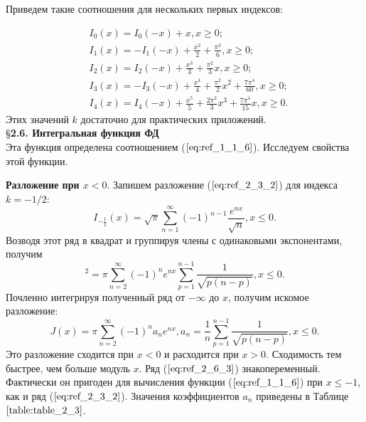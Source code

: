 Приведем такие соотношения для нескольких первых индексов:

\begin{equation}
\begin{aligned}
&I_0(x)=I_0(-x)+x,x \geqslant 0; \\
&I_1(x)=-I_1(-x)+\frac{x^2}{2} + \frac{\pi^2}{6},x \geqslant 0;\\
&I_2(x)=I_2(-x)+\frac{x^3}{3} + \frac{\pi^2}{3}x,x \geqslant 0;\\
&I_3(x)=-I_3(-x)+\frac{x^4}{4} + \frac{\pi^2}{2}x^2 + \frac{7\pi^4}{60},x \geqslant 0;\\
&I_4(x)=I_4(-x)+\frac{x^5}{5} + \frac{2\pi^2}{3}x^3 + \frac{7\pi^4}{15}x,x \geqslant 0.
\end{aligned}
\label{eq:ref_2_5_4}
\end{equation}
Этих значений $k$ достаточно для практических приложений.
\\

\S \textbf{2.6. Интегральная функция ФД}
\\

Эта функция определена соотношением ($\ref{eq:ref_1_1_6}$). Исследуем свойства этой функции.

\textbf{Разложение при $x < 0.$} Запишем разложение ($\ref{eq:ref_2_3_2}$) для индекса $k=-1/2$:
\begin{equation}
I_{-\frac{1}{2}}(x)=\sqrt{\pi} \sum\limits_{n=1}^{\infty} (-1)^{n-1} \frac{e^{nx}}{\sqrt{n}},x \leqslant 0.
\label{eq:ref_2_6_1}
\end{equation}
Возводя этот ряд в квадрат и группируя члены с одинаковыми экспонентами, получим
\begin{equation}
[I_{-\frac{1}{2}}(x)]^2 = \pi \sum\limits_{n=2}^{\infty} (-1)^n e^{nx} \sum\limits_{p=1}^{n-1} \frac{1}{\sqrt{p(n-p)}},x \leqslant 0.
\label{eq:ref_2_6_2}
\end{equation}
Почленно интегрируя полученный ряд от $-\infty$ до $x$, получим искомое
разложение:
\begin{equation}
J(x) = \pi \sum\limits_{n=2}^{\infty} (-1)^n a_n e^{nx}, a_n = \frac{1}{n} \sum_{p=1}^{n-1} \frac{1}{\sqrt{p(n-p)}}, x \leqslant 0.
\label{eq:ref_2_6_3}
\end{equation}
Это разложение сходится при $x < 0$ и расходится при $x > 0$. Сходимость тем
быстрее, чем больше модуль $x$. Ряд ($\ref{eq:ref_2_6_3}$) знакопеременный. Фактически он
пригоден для вычисления функции ($\ref{eq:ref_1_1_6}$) при $x \leqslant -1$, как и ряд ($\ref{eq:ref_2_3_2}$). Значения коэффициентов $a_n$ приведены в Таблице $\ref{table:table_2_3}$.

